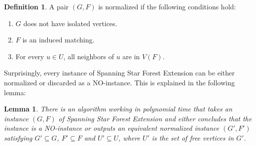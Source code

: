 \documentclass[en]{pracamgr}
\newtheorem{lemma}{Lemma}
\theoremstyle{definition}
\newtheorem{definition}{Definition}
\newcommand{\ssfep}{{\sc Spanning Star Forest Extension}}
\begin{document}
\begin{definition}\label{norm-ssfe}
	A pair $(G,F)$ is normalized if the following conditions hold:
	\begin{enumerate}
		\item $G$ does not have isolated vertices.
		\item $F$ is an induced matching.
		\item For every $u \in U$, all neighbors of $u$ are in $V(F)$.
	\end{enumerate}
\end{definition}

Surprisingly, every instance of \ssfep{} can be either normalized or discarded as a NO-instance. This is explained in the following lemma:

\begin{lemma}
	There is an algorithm working in polynomial time that takes an instance $(G,F)$ of \ssfep{} and either concludes that the instance is a NO-instance or outputs an equivalent normalized instance $(G',F')$ satisfying $G' \subseteq G$,  $F' \subseteq F$ and $U' \subseteq U$, where $U'$ is the set of free vertices in $G'$.
\end{lemma}
\end{document}
